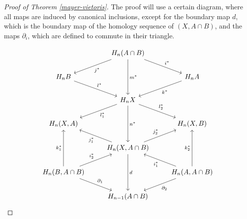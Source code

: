 \begin{proof}[Proof of Theorem \ref{mayer-vietoris}]
The proof will use a certain diagram, where all maps are induced by canonical inclusions, except for the boundary map $d$, which is the boundary map of the homology sequence of $(X,A\cap B)$, and the maps $\partial_i$, which are defined to commute in their triangle.

\[\begin{tikzcd}
                                                                                  & H_n(A\cap B) \arrow[ld, "j^*"] \arrow[rd, "i^*"] \arrow[dd, "m^*"]       &                                                                                   \\
H_nB \arrow[rd, "l^*"]                                                            &                                                                          & H_nA \arrow[ld, "k^*"]                                                            \\
                                                                                  & H_n X \arrow[ld, "l_1^*"] \arrow[rd, "l_2^*"] \arrow[dd, "n^*"]          &                                                                                   \\
{H_n(X,A)}                                                                        &                                                                          & {H_n(X,B)}                                                                        \\
                                                                                  & {H_n(X,A\cap B)} \arrow[ru, "j_2^*"] \arrow[lu, "j_1^*"] \arrow[dd, "d"] &                                                                                   \\
{H_n(B,A\cap B)} \arrow[uu, "k_1^*"] \arrow[ru, "i_2^*"] \arrow[rd, "\partial_1"] &                                                                          & {H_n(A,A\cap B)} \arrow[uu, "k_2^*"] \arrow[lu, "i_1^*"] \arrow[ld, "\partial_2"] \\
                                                                                  & H_{n-1}(A\cap B)                                                         &                                                                                  
\end{tikzcd}\]


\end{proof}
